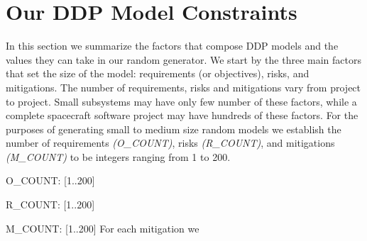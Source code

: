 \section{Our DDP Model Constraints}
In this section we summarize the factors that compose DDP models and the values they can take in our random generator. We start by the three main factors that set the size of the model: requirements (or objectives), risks, and mitigations. The number of requirements, risks and mitigations vary from project to project. Small subsystems may have only few number of these factors, while a complete spacecraft software project may have hundreds of these factors. For the purposes of generating small to medium size random models we establish the number of requirements \textit{(O\_COUNT)}, risks \textit{(R\_COUNT)}, and mitigations \textit{(M\_COUNT)} to be integers ranging from 1 to 200.
\bi
\item O\_COUNT: [1..200]
\item R\_COUNT: [1..200]
\item M\_COUNT: [1..200]
\ei
For each mitigation we